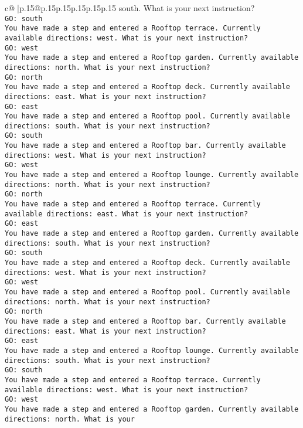 \documentclass{article}
\begin{document}
{\begin{supertabular}{c@{$\;$}|p{.15\linewidth}@{}p{.15\linewidth}p{.15\linewidth}p{.15\linewidth}p{.15\linewidth}p{.15\linewidth}}
{{{south. What is your next instruction?\\ \tt GO: south\\ \tt You have made a step and entered a Rooftop terrace. Currently available directions: west. What is your next instruction?\\ \tt GO: west\\ \tt You have made a step and entered a Rooftop garden. Currently available directions: north. What is your next instruction?\\ \tt GO: north\\ \tt You have made a step and entered a Rooftop deck. Currently available directions: east. What is your next instruction?\\ \tt GO: east\\ \tt You have made a step and entered a Rooftop pool. Currently available directions: south. What is your next instruction?\\ \tt GO: south\\ \tt You have made a step and entered a Rooftop bar. Currently available directions: west. What is your next instruction?\\ \tt GO: west\\ \tt You have made a step and entered a Rooftop lounge. Currently available directions: north. What is your next instruction?\\ \tt GO: north\\ \tt You have made a step and entered a Rooftop terrace. Currently available directions: east. What is your next instruction?\\ \tt GO: east\\ \tt You have made a step and entered a Rooftop garden. Currently available directions: south. What is your next instruction?\\ \tt GO: south\\ \tt You have made a step and entered a Rooftop deck. Currently available directions: west. What is your next instruction?\\ \tt GO: west\\ \tt You have made a step and entered a Rooftop pool. Currently available directions: north. What is your next instruction?\\ \tt GO: north\\ \tt You have made a step and entered a Rooftop bar. Currently available directions: east. What is your next instruction?\\ \tt GO: east\\ \tt You have made a step and entered a Rooftop lounge. Currently available directions: south. What is your next instruction?\\ \tt GO: south\\ \tt You have made a step and entered a Rooftop terrace. Currently available directions: west. What is your next instruction?\\ \tt GO: west\\ \tt You have made a step and entered a Rooftop garden. Currently available directions: north. What is your }}}
\end{supertabular}}
\end{document}
